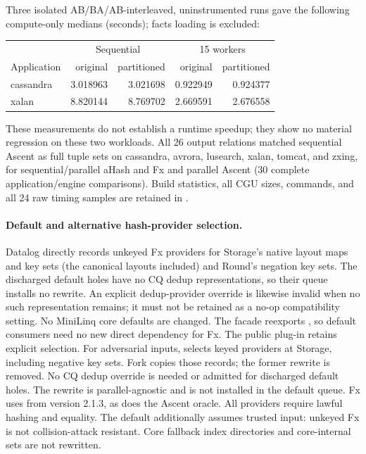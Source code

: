 Three isolated AB/BA/AB-interleaved, uninstrumented runs gave the following
compute-only medians (seconds); facts loading is excluded:
\begin{center}
\begin{tabular}{lrrrr}
\toprule
& \multicolumn{2}{c}{Sequential} & \multicolumn{2}{c}{15 workers}\\
Application & original & partitioned & original & partitioned\\
\midrule
cassandra & 3.018963 & 3.021698 & 0.922949 & 0.924377\\
xalan & 8.820144 & 8.769702 & 2.669591 & 2.676558\\
\bottomrule
\end{tabular}
\end{center}
These measurements do not establish a runtime speedup; they show no material
regression on these two workloads. All 26 output relations matched sequential
Ascent as full tuple sets on cassandra, avrora, lusearch, xalan, tomcat, and
zxing, for sequential/parallel aHash and Fx and parallel Ascent (30 complete
application/engine comparisons). Build statistics, all CGU sizes, commands,
and all 24 raw timing samples are retained in
.

\paragraph{Default and alternative hash-provider selection.}
Datalog directly records unkeyed Fx providers for Storage's native layout
maps and key sets (the canonical layouts included) and Round's negation key sets.
The discharged default holes have no CQ dedup representations, so their queue
installs no  rewrite. An explicit dedup-provider
override is likewise invalid when no such representation remains; it must not
be retained as a no-op compatibility setting.
No MiniLinq core defaults are changed. The facade reexports
, so default consumers need no new direct dependency for Fx.
The public  plug-in retains explicit
 selection. For adversarial inputs, 
selects keyed  providers at Storage, including negative key sets.
Fork copies those records; the former  rewrite is removed.
No CQ dedup override is needed or admitted for discharged default holes.
The rewrite is parallel-agnostic and is not installed in the default queue.
Fx uses  from version 2.1.3,
as does the Ascent oracle. All providers require lawful hashing and equality.
The default additionally assumes trusted input: unkeyed Fx is not
collision-attack resistant. Core fallback index directories and core-internal
sets are not rewritten.

